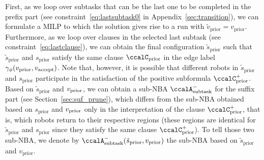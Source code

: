 \documentclass[Afour,sageh,times]{sagej}
\newcommand{\auto}[1]{\ccalA_{\textup{#1}}}
\newcommand{\vertex}[1]{v_{\textup{#1}}}
\begin{document}
{First, as we loop over subtasks that can be the last one to be completed in the prefix part (see constraint~\eqref{eq:lastsubtask0} in Appendix~\ref{sec:transition}), we can formulate a MILP to which the solution gives rise to a run with $\tilde{v}_{\text{prior}} = {v}_{\text{prior}}$. Furthermore, as we loop over clauses in the selected last subtask (see constraint~\eqref{eq:lastclause}), we can obtain the final configuration $\tilde{s}_{\text{prior}}$ such that $\tilde{s}_{\text{prior}}$ and ${s}_{\text{prior}}$ satisfy the same clause $\ccalC_{\text{prior}}$ in the edge label $\gamma_\phi(\vertex{prior}, \vertex{accept})$. Note that, however, it is possible that different robots in $\tilde{s}_{\text{prior}}$ and $s_{\text{prior}}$ participate in the satisfaction of the positive subformula $\ccalC_\text{prior}^+$. Based on $\tilde{s}_{\text{prior}}$ and $\vertex{prior}$, we can obtain a sub-NBA $\auto{subtask}^-$ for the suffix part (see Section~\ref{sec:suf_prune}), which  differs from the sub-NBA obtained based on  $s_{\text{prior}}$ and $\vertex{prior}$ only in the interpretation of the  clause $\ccalC_\text{prior}^+$, that is, which robots return to their respective regions (these regions are identical for $\tilde{s}_{\text{prior}}$ and $s_{\text{prior}}$ since they satisfy the same clause $\ccalC_{\text{prior}}^+$). To tell those two sub-NBA, we denote by $\auto{subtask}^-( \tilde{s}_{\text{prior}},  {v}_{\text{prior}})$ the sub-NBA based on $\tilde{s}_{\text{prior}} $ and $  {v}_{\text{prior}}$.

}
\end{document}
